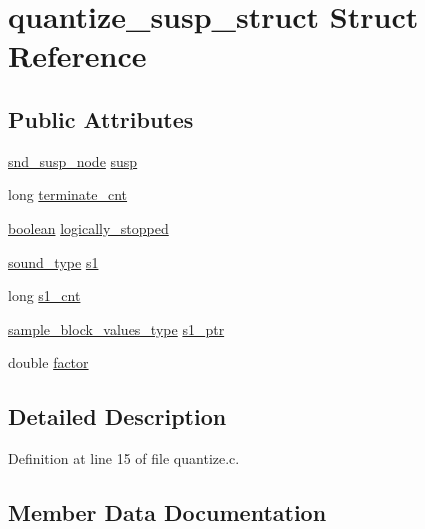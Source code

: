 \hypertarget{structquantize__susp__struct}{}\section{quantize\+\_\+susp\+\_\+struct Struct Reference}
\label{structquantize__susp__struct}
\subsection*{Public Attributes}
\begin{DoxyCompactItemize}
\item 
\hyperlink{sound_8h_a6b268203688a934bd798ceb55f85d4c0}{snd\+\_\+susp\+\_\+node} \hyperlink{structquantize__susp__struct_aef6c5503b7f8bebef7c32ae206eca637}{susp}
\item 
long \hyperlink{structquantize__susp__struct_a130b67dd9a1c8539d86baba0cf76e8de}{terminate\+\_\+cnt}
\item 
\hyperlink{cext_8h_a7670a4e8a07d9ebb00411948b0bbf86d}{boolean} \hyperlink{structquantize__susp__struct_ae5b076ce0aaa9bc412c62d79fbc94ee5}{logically\+\_\+stopped}
\item 
\hyperlink{sound_8h_a792cec4ed9d6d636d342d9365ba265ea}{sound\+\_\+type} \hyperlink{structquantize__susp__struct_a025bb9d218d19859557eb76837418741}{s1}
\item 
long \hyperlink{structquantize__susp__struct_aa066a2a7392c6ff0b6f6cd081a4745a4}{s1\+\_\+cnt}
\item 
\hyperlink{sound_8h_a83d17f7b465d1591f27cd28fc5eb8a03}{sample\+\_\+block\+\_\+values\+\_\+type} \hyperlink{structquantize__susp__struct_ac714b40b000e2a534180db62f1a12979}{s1\+\_\+ptr}
\item 
double \hyperlink{structquantize__susp__struct_aaae096a9eb40eb16f9c150b8589068c3}{factor}
\end{DoxyCompactItemize}


\subsection{Detailed Description}


Definition at line 15 of file quantize.\+c.



\subsection{Member Data Documentation}
